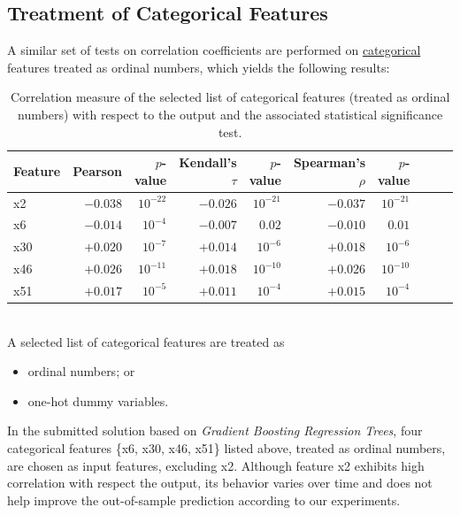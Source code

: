 \documentclass[
11pt, %
a4paper, %
oneside, %
headinclude,footinclude, %
BCOR5mm, %
]{scrartcl}
\begin{document}
\subsection{Treatment of Categorical Features}
A similar set of tests on correlation coefficients are performed on \underline{categorical} features treated as ordinal numbers, which yields the following results:\\
\begin{table}[ht!]
	\footnotesize
	\center
	\begin{tabular}{lrrrrrrrrr}  
		\toprule
		Feature & Pearson & $p$-value & Kendall's $\tau$ & $p$-value & Spearman's $\rho$ & $p$-value  \\
		\midrule
		x2 & $-0.038$	& $10^{-22}$	&	$-0.026$ & $10^{-21}$	& $-0.037$	&	$10^{-21}$ \\
		x6 & $-0.014$	& $10^{-4}$	&	$-0.007$ & $0.02$	&	$-0.010$ &	$0.01$ \\
		x30 & 	$+0.020$ & $10^{-7}$	&	$+0.014$ & $10^{-6}$	& $+0.018$	&	$10^{-6}$ \\
		x46 & $+0.026$	& $10^{-11}$	&	$+0.018$ & $10^{-10}$	& $+0.026$	&	$10^{-10}$ \\
		x51 & $+0.017$	& $10^{-5}$	&	$+0.011$ & $10^{-4}$	& $+0.015$	&	$10^{-4}$ \\
		\bottomrule
	\end{tabular}
	\caption{\label{corr} Correlation measure of the selected list of categorical features (treated as ordinal numbers) with respect to the output and the associated statistical	significance test.} 
\end{table}\\
A selected list of categorical features are treated as
\begin{itemize}[noitemsep]
\item ordinal numbers; or
\item one-hot dummy variables.
\end{itemize}

In the submitted solution based on \textit{Gradient Boosting Regression Trees}, four categorical features \{x6, x30, x46, x51\} listed above, treated as ordinal numbers, are chosen as input features, excluding x2. Although feature x2 exhibits high correlation with respect the output, its behavior varies over time and does not help improve the out-of-sample prediction according to our experiments.
\end{document}
